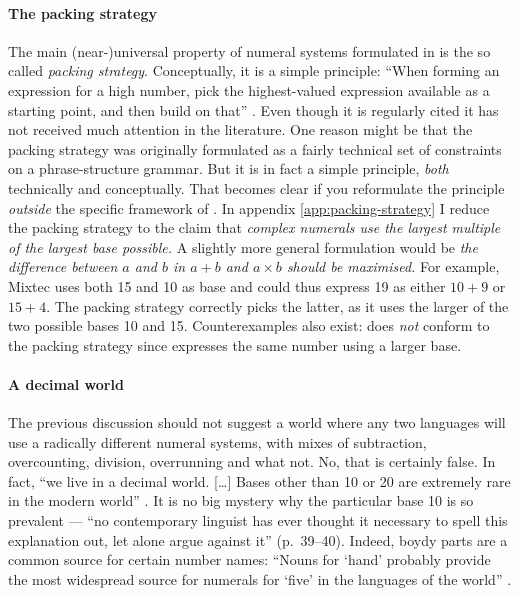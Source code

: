 \documentclass{../src/bcthesispart}
\begin{document}
\paragraph{The packing strategy}

The main (near-)universal property of numeral systems formulated in \textcite{Hurford1975} is the so called \emph{packing strategy}.
Conceptually, it is a simple principle: “When forming an expression for a high number, pick the highest-valued expression available as a starting point, and then build on that” \parencite[243]{Hurford1987}. 
Even though it is regularly cited it has not received much attention in the literature.
One reason might be that the packing strategy was originally formulated as a fairly technical set of constraints on a phrase-structure grammar. 
But it is in fact a simple principle, \emph{both} technically and conceptually.
That becomes clear if you reformulate the principle \emph{outside} the specific framework of \textcite{Hurford1975}.
In appendix \ref{app:packing-strategy} I reduce the packing strategy to the claim that \emph{complex numerals use the largest multiple of the largest base possible.}
A slightly more general formulation would be \emph{the difference between $a$ and $b$ in $a+b$ and $a\times b$ should be maximised.}
For example, Mixtec uses both 15 and 10 as base and could thus express 19 as either $10 + 9$ or $15+4$. 
The packing strategy correctly picks the latter, as it uses the larger of the two possible bases 10 and 15.
Counterexamples also exist:  does \emph{not} conform to the packing strategy since  expresses the same number using a larger base.





\paragraph{A decimal world}

The previous discussion should not suggest a world where any two languages will use a radically different numeral systems, with mixes of subtraction, overcounting, division, overrunning and what not.
No, that is certainly false.
In fact, “we live in a decimal world. 
[…] Bases other than 10 or 20 are extremely rare in the modern world” \parencite{Comrie2013}.
It is no big mystery why the particular base 10 is so prevalent — “no contemporary linguist has ever thought it necessary to spell this explanation out, let alone argue against it” (p.\ 39–40).
Indeed, boydy parts are a common source for certain number names: “Nouns for ‘hand’ probably provide the most widespread source for numerals for ‘five’ in the languages of the world” \parencite[166]{Heine2002}.
\end{document}
